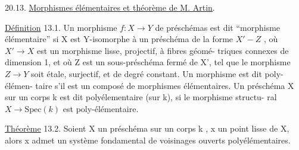 
20.13. \uline{Morphismes élémentaires et théorème de M. Artin}.

\uline{Définition} 13.1. Un morphisme $f:X\to Y$ de préschémas est dit ``morphisme
 élémentaire'' si X est  Y-isomorphe à un préschéma de la forme
$X' - Z$ , où $X'\to X$ est un morphisme lisse, projectif, à fibres géomé-%
triques connexes de dimension 1, et où Z est un sous-préschéma fermé
de X',  tel que le morphisme $Z\to Y$ soit étale, surjectif, et
de degré constant. Un morphisme est dit  poly-élémen-%
taire s'il est un composé de morphismes élémentaires. Un préschéma X
sur un corps k est dit polyélementaire (sur k), si le morphisme structu-%
ral $X\to \mathrm{Spec}(k)$ est poly-élémentaire.

\uline{Théorème} 13.2.  Soient X un préschéma  sur un corps k , x un point lisse
de X, alors x admet un système fondamental de voisinages ouverts
polyélémentaires.

